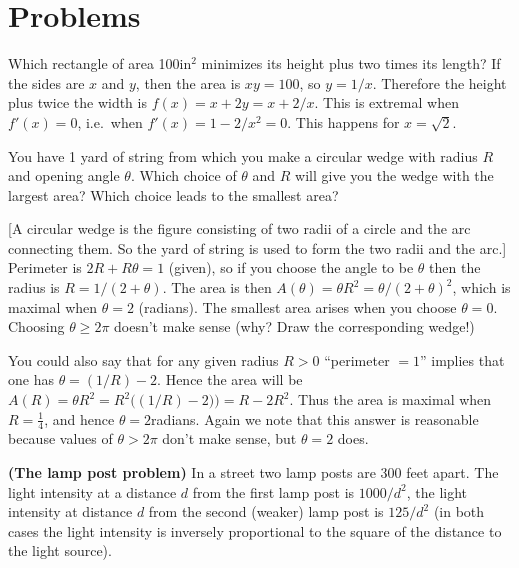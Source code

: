 \section{Problems} %
\problemfont %
\begin{multicols}{2}\setlength{\parindent}{0pt}


\problem Which rectangle of area 100in$^2$ minimizes its height plus %
two times its length?
\answer %
If the sides are $x$ and $y$, then the area is $xy = 100$, so $y=1/x$.
Therefore the height plus twice the width is $f(x) = x+2y = x+2/x$.
This is extremal when $f'(x) = 0$, i.e.\ when $f'(x) = 1-2/x^2 = 0$.
This happens for $x=\sqrt2$.
\endanswer






\problem You have 1 yard of string from which you make a circular %
wedge with radius $R$ and opening angle $ \theta$.  Which choice of $
\theta$ and $R$ will give you the wedge with the largest area?  Which
choice leads to the smallest area?

[A circular wedge is the figure consisting of two radii of a circle
and the arc connecting them.  So the yard of string is used to form
the two radii and the arc.]
\answer %
Perimeter is $2R+R\theta = 1$ (given), so if you choose the angle to
be $\theta$ then the radius is $R=1/(2+\theta)$.  The area is then
$A(\theta) = \theta R^2 = \theta/(2+\theta)^2$, which is maximal when
$\theta=2$ (radians).  The smallest area arises when you choose
$\theta=0$.  Choosing $\theta\ge 2\pi$ doesn't make sense (why?  Draw
the corresponding wedge!)




You could also say that for any given radius $R>0$ ``perimeter
$=1$'' implies that one has $\theta = (1/R)-2$.  Hence the area
will be $A(R) =\theta R^2 = R^2\bigl( (1/R)-2 )\bigr) = R-2R^2$.  
Thus the area is maximal when $R=\frac14$, and hence
$\theta=2$radians.  Again we note that this answer is reasonable
because values of $\theta>2\pi$ don't make sense, but $\theta=2$
does.
\endanswer








\problem \groupproblem \textbf{(The lamp post problem)} %
In a street two lamp posts are 300 feet apart.  The light intensity at
a distance $d$ from the first lamp post is $1000/d^2$, the light
intensity at distance $d$ from the second (weaker) lamp post is
$125/d^2$ (in both cases the light intensity is inversely proportional
to the square of the distance to the light source).  





\end{multicols}

